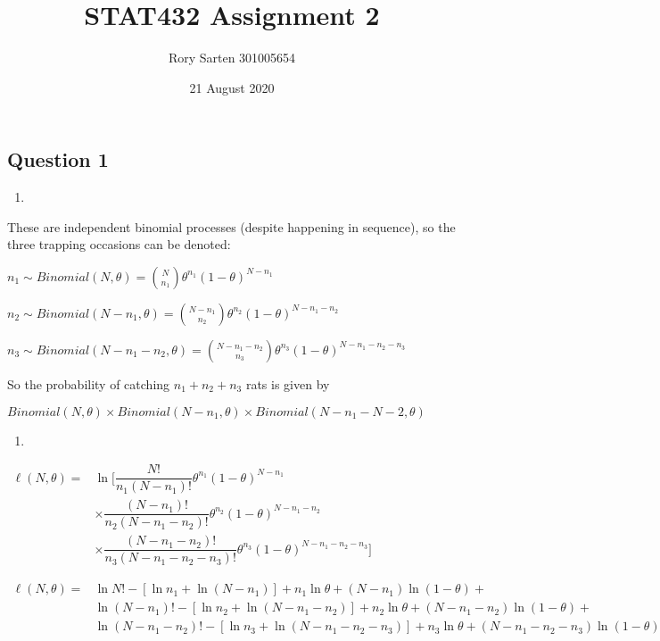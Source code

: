 \documentclass[]{article}
\title{STAT432 Assignment 2}
\author{Rory Sarten 301005654}
\date{21 August 2020}
\begin{document}
\maketitle

\subsection{Question 1}\label{question-1}

\begin{enumerate}
\def\labelenumi{\alph{enumi})}
\item
\end{enumerate}

These are independent binomial processes (despite happening in
sequence), so the three trapping occasions can be denoted:

\(n_1 \sim Binomial(N, \theta) = \binom{N}{n_{1}} \theta^{n_1} (1 - \theta)^{N - n_1}\)

\(n_2 \sim Binomial(N - n_1, \theta) = \binom{N - n_1}{n_{2}} \theta^{n_2} (1 - \theta)^{N - n_1 - n_2}\)

\(n_3 \sim Binomial(N - n_1 - n_2, \theta) = \binom{N - n_1 - n_2}{n_{3}} \theta^{n_3} (1 - \theta)^{N - n_1 - n_2 - n_3}\)

So the probability of catching \(n_1 + n_2 + n_3\) rats is given by

\(Binomial(N, \theta) \times Binomial(N - n_1, \theta) \times Binomial(N - n_1 - N-2, \theta)\)

\begin{enumerate}
\def\labelenumi{\alph{enumi})}
\setcounter{enumi}{1}
\item
\end{enumerate}

\(\begin{aligned}\ell(N,\theta) = &\ln [ \dfrac{N!}{n_1(N-n_1)!}\theta^{n_1}(1-\theta)^{N-n_1} \\& \times\dfrac{(N-n_1)!}{n_2(N-n_1-n_2)!}\theta^{n_2}(1-\theta)^{N-n_1-n_2} \\& \times\dfrac{(N-n_1-n_2)!}{n_3(N-n_1-n_2-n_3)!}\theta^{n_3}(1-\theta)^{N-n_1-n_2-n_3}]\end{aligned}\)

\(\begin{aligned}\ell(N,\theta) = & \ln N! - [\ln n_1 + \ln (N-n_1)] + n_1 \ln \theta + (N-n_1)\ln (1 - \theta) +\\&\ln (N-n_1)! - [\ln n_2 + \ln (N-n_1-n_2)] + n_2 \ln \theta + (N-n_1-n_2)\ln (1 - \theta) + \\&\ln (N-n_1-n_2)! - [\ln n_3 + \ln (N-n_1-n_2-n_3)] + n_3 \ln \theta + (N-n_1-n_2-n_3)\ln (1 - \theta)\end{aligned}\)
\end{document}
